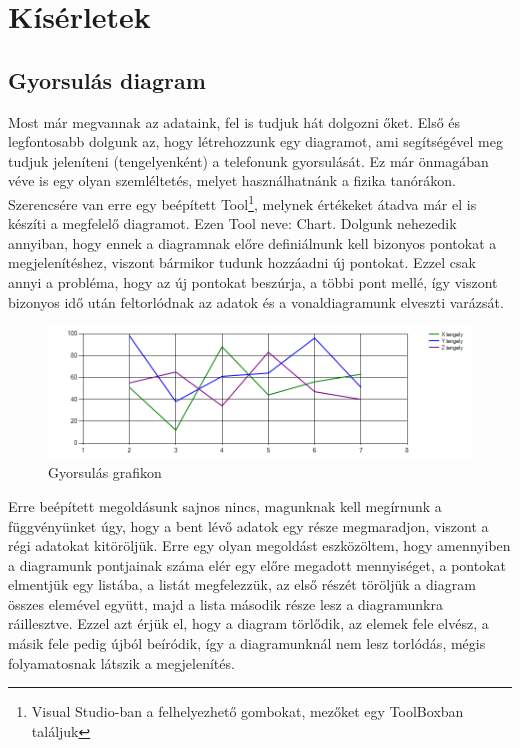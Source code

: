 \documentclass{thesis-ekf}
\theoremstyle{definition}
\theoremstyle{remark}
\begin{document}
\section{Kísérletek}
\subsection{Gyorsulás diagram}
Most már megvannak az adataink, fel is tudjuk hát dolgozni őket. Első és legfontosabb dolgunk az, hogy létrehozzunk egy diagramot, ami segítségével meg tudjuk jeleníteni (tengelyenként) a telefonunk gyorsulását. Ez már önmagában véve is egy olyan szemléltetés, melyet használhatnánk a fizika tanórákon. Szerencsére van erre egy beépített Tool\footnote{Visual Studio-ban a felhelyezhető gombokat, mezőket egy ToolBoxban találjuk}, melynek értékeket átadva már el is készíti a megfelelő diagramot. Ezen Tool neve: Chart. Dolgunk nehezedik annyiban, hogy ennek a diagramnak előre definiálnunk kell bizonyos pontokat a megjelenítéshez, viszont bármikor tudunk hozzáadni új pontokat. Ezzel csak annyi a probléma, hogy az új pontokat beszúrja, a többi pont mellé, így viszont bizonyos idő után feltorlódnak az adatok és a vonaldiagramunk elveszti varázsát. 
\begin{figure}[!h]
	\centering
	\includegraphics[width=15cm]{grafikon}
	\caption{Gyorsulás grafikon}\label{grafikon}
\end{figure}
\par Erre beépített megoldásunk sajnos nincs, magunknak kell megírnunk a függvényünket úgy, hogy a bent lévő adatok egy része megmaradjon, viszont a régi adatokat kitöröljük. Erre egy olyan megoldást eszközöltem, hogy amennyiben a diagramunk pontjainak száma elér egy előre megadott mennyiséget, a pontokat elmentjük egy listába, a listát megfelezzük, az első részét töröljük a diagram összes elemével együtt, majd a lista második része lesz a diagramunkra ráillesztve. Ezzel azt érjük el, hogy a diagram törlődik, az elemek fele elvész, a másik fele pedig újból beíródik, így a diagramunknál nem lesz torlódás, mégis folyamatosnak látszik a megjelenítés.
\end{document}
